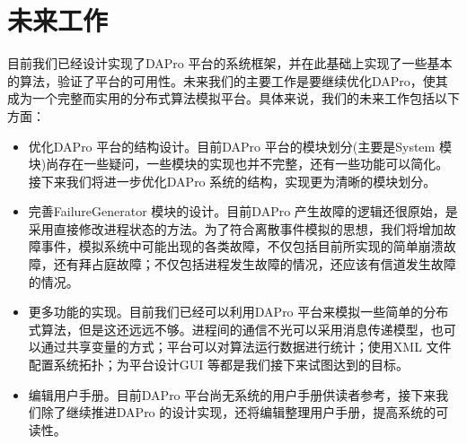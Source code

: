     \section{未来工作}
    目前我们已经设计实现了DAPro 平台的系统框架，并在此基础上实现了一些基本的算法，验证了平台的可用性。未来我们的主要工作是要继续优化DAPro，使其成为一个完整而实用的分布式算法模拟平台。具体来说，我们的未来工作包括以下方面：
    \begin{itemize}
      \item 优化DAPro 平台的结构设计。目前DAPro 平台的模块划分(主要是System 模块)尚存在一些疑问，一些模块的实现也并不完整，还有一些功能可以简化。接下来我们将进一步优化DAPro 系统的结构，实现更为清晰的模块划分。
      \item 完善FailureGenerator 模块的设计。目前DAPro 产生故障的逻辑还很原始，是采用直接修改进程状态的方法。为了符合离散事件模拟的思想，我们将增加故障事件，模拟系统中可能出现的各类故障，不仅包括目前所实现的简单崩溃故障，还有拜占庭故障；不仅包括进程发生故障的情况，还应该有信道发生故障的情况。
      \item 更多功能的实现。目前我们已经可以利用DAPro 平台来模拟一些简单的分布式算法，但是这还远远不够。进程间的通信不光可以采用消息传递模型，也可以通过共享变量的方式；平台可以对算法运行数据进行统计；使用XML 文件配置系统拓扑；为平台设计GUI 等都是我们接下来试图达到的目标。
      \item 编辑用户手册。目前DAPro 平台尚无系统的用户手册供读者参考，接下来我们除了继续推进DAPro 的设计实现，还将编辑整理用户手册，提高系统的可读性。
    \end{itemize}